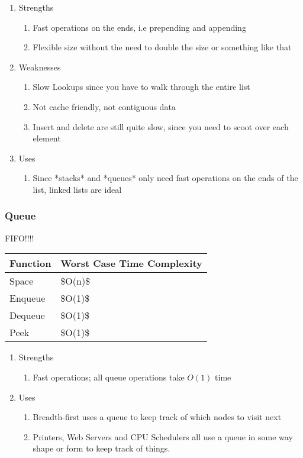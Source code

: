 \documentclass{article}
\begin{document}
\begin{enumerate}
    \item Strengths
    \begin{enumerate}
        \item Fast operations on the ends, i.e prepending and appending
        \item Flexible size without the need to double the size or something like that
    \end{enumerate}
    \item Weaknesses
    \begin{enumerate}   
        \item Slow Lookups since you have to walk through the entire list
        \item Not cache friendly, not contiguous data
        \item Insert and delete are still quite slow, since you need to scoot over each element
    \end{enumerate}
    \item Uses
    \begin{enumerate}
        \item Since *stacks* and *queues* only need fast operations on the ends of the list, linked lists are ideal
    \end{enumerate}
\end{enumerate}

\subsubsection{Queue}
 
FIFO!!!!
 
 

 \begin{table}[!ht]
    \centering
    \begin{tabular}{|l|l|}
    \hline
        Function & Worst Case Time Complexity \\ \hline
        Space & \$O(n)\$ \\ \hline
        Enqueue & \$O(1)\$ \\ \hline
        Dequeue & \$O(1)\$ \\ \hline
        Peek & \$O(1)\$ \\ \hline
    \end{tabular}
\end{table}

\begin{enumerate}
    \item Strengths
    \begin{enumerate}
        \item Fast operations; all queue operations take $O(1)$ time
    \end{enumerate}
    \item Uses
    \begin{enumerate}
        \item Breadth-first uses a queue to keep track of which nodes to visit next
        \item Printers, Web Servers and CPU Schedulers all use a queue in some way shape or form to keep track of things.
    \end{enumerate}
\end{enumerate}
\end{document}
